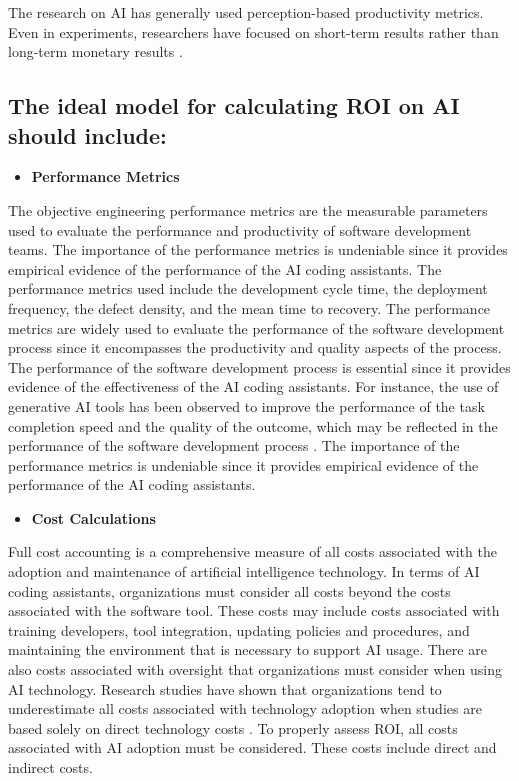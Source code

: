 The research on AI has generally used perception-based productivity metrics. Even in experiments, researchers have focused on short-term results rather than long-term monetary results \autocite{Noy2023}. 


\subsection {The ideal model for calculating ROI on AI should include: }
\label{sec:The ideal model for calculating ROI on AI should include}
\begin{itemize}
	\item \textbf{Performance Metrics} 
\end{itemize}
The objective engineering performance metrics are the measurable parameters used to evaluate the performance and productivity of software development teams. The importance of the performance metrics is undeniable since it provides empirical evidence of the performance of the AI coding assistants. The performance metrics used include the development cycle time, the deployment frequency, the defect density, and the mean time to recovery. The performance metrics are widely used to evaluate the performance of the software development process since it encompasses the productivity and quality aspects of the process. The performance of the software development process is essential since it provides evidence of the effectiveness of the AI coding assistants. For instance, the use of generative AI tools has been observed to improve the performance of the task completion speed and the quality of the outcome, which may be reflected in the performance of the software development process \autocite{Noy2023}. The importance of the performance metrics is undeniable since it provides empirical evidence of the performance of the AI coding assistants.

\begin{itemize}
	\item \textbf{Cost Calculations} 
\end{itemize}
Full cost accounting is a comprehensive measure of all costs associated with the adoption and maintenance of artificial intelligence technology. In terms of AI coding assistants, organizations must consider all costs beyond the costs associated with the software tool. These costs may include costs associated with training developers, tool integration, updating policies and procedures, and maintaining the environment that is necessary to support AI usage. There are also costs associated with oversight that organizations must consider when using AI technology. Research studies have shown that organizations tend to underestimate all costs associated with technology adoption when studies are based solely on direct technology costs \autocite{Babina2024}. To properly assess ROI, all costs associated with AI adoption must be considered. These costs include direct and indirect costs.

